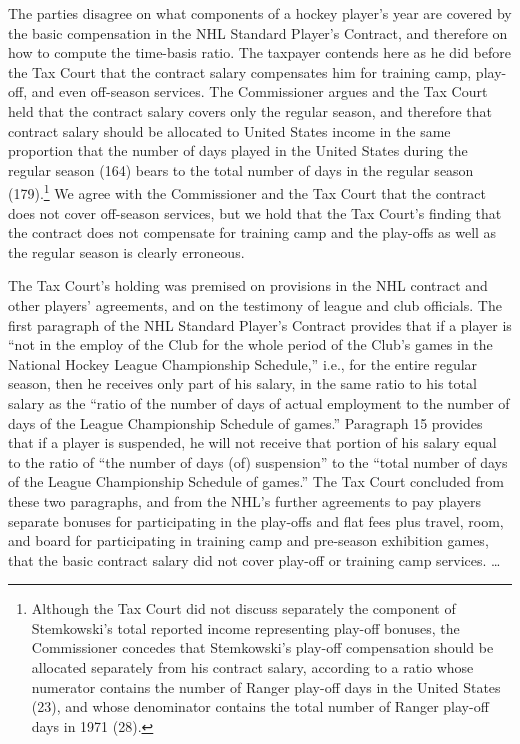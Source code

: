 \begin{select}
The parties disagree on what components of a hockey player's year are covered by the basic compensation in the NHL Standard Player's Contract, and therefore on how to compute the time-basis ratio. The taxpayer contends here as he did before the Tax Court that the contract salary compensates him for training camp, play-off, and even off-season services. The Commissioner argues and the Tax Court held that the contract salary covers only the regular season, and therefore that contract salary should be allocated to United States income in the same proportion that the number of days played in the United States during the regular season (164) bears to the total number of days in the regular season (179).\footnote[4]{Although the Tax Court did not discuss separately the component of Stemkowski's total reported income representing play-off bonuses, the Commissioner concedes that Stemkowski's play-off compensation should be allocated separately from his contract salary, according to a ratio whose numerator contains the number of Ranger play-off days in the United States (23), and whose denominator contains the total number of Ranger play-off days in 1971 (28).} We agree with the Commissioner and the Tax Court that the contract does not cover off-season services, but we hold that the Tax Court's finding that the contract does not compensate for training camp and the play-offs as well as the regular season is clearly erroneous. 

The Tax Court's holding was premised on provisions in the NHL contract and other players' agreements, and on the testimony of league and club officials. The first paragraph of the NHL Standard Player's Contract provides that if a player is ``not in the employ of the Club for the whole period of the Club's games in the National Hockey League Championship Schedule,'' i.e., for the entire regular season, then he receives only part of his salary, in the same ratio to his total salary as the ``ratio of the number of days of actual employment to the number of days of the League Championship Schedule of games.'' Paragraph 15 provides that if a player is suspended, he will not receive that portion of his salary equal to the ratio of ``the number of days (of) suspension'' to the ``total number of days of the League Championship Schedule of games.'' The Tax Court concluded from these two paragraphs, and from the NHL's further agreements to pay players separate bonuses for participating in the play-offs and flat fees plus travel, room, and board for participating in training camp and pre-season exhibition games, that the basic contract salary did not cover play-off or training camp services. \ldots


\end{select}
